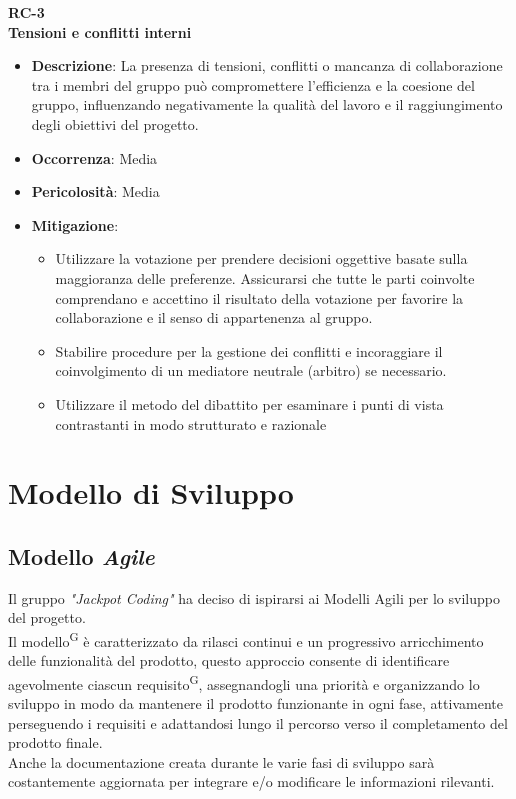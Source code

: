\documentclass[5pt]{article}
\begin{document}
\textbf{RC-3}\\
\textbf{Tensioni e conflitti interni}
\begin{itemize}
  \item \textbf{Descrizione}: La presenza di tensioni, conflitti o mancanza di collaborazione tra i membri del gruppo può compromettere l'efficienza e la coesione del gruppo, influenzando negativamente la qualità del lavoro e il raggiungimento degli obiettivi del progetto.
  \item \textbf{Occorrenza}: Media
  \item \textbf{Pericolosità}: Media
  \item \textbf{Mitigazione}: 
    \begin{itemize}
      \item Utilizzare la votazione per prendere decisioni oggettive basate sulla maggioranza delle preferenze. Assicurarsi che tutte le parti coinvolte comprendano e accettino il risultato della votazione per favorire la collaborazione e il senso di appartenenza al gruppo.
      \item Stabilire procedure per la gestione dei conflitti e incoraggiare il coinvolgimento di un mediatore neutrale (arbitro) se necessario.
      \item Utilizzare il metodo del dibattito per esaminare i punti di vista contrastanti in modo strutturato e razionale
    \end{itemize}
\end{itemize}

\section{Modello di Sviluppo}
\subsection{Modello \textit{Agile}}
Il gruppo \textit{"Jackpot Coding"} ha deciso di ispirarsi ai Modelli Agili per lo sviluppo del progetto.\\
Il modello\textsuperscript{G} è caratterizzato da rilasci continui e un progressivo arricchimento delle funzionalità del prodotto, questo approccio consente di identificare agevolmente ciascun requisito\textsuperscript{G}, assegnandogli una priorità e organizzando lo sviluppo in modo da mantenere il prodotto funzionante in ogni fase, attivamente perseguendo i requisiti e adattandosi lungo il percorso verso il completamento del prodotto finale.\\
Anche la documentazione creata durante le varie fasi di sviluppo sarà costantemente aggiornata per integrare e/o modificare le informazioni rilevanti.
\end{document}
